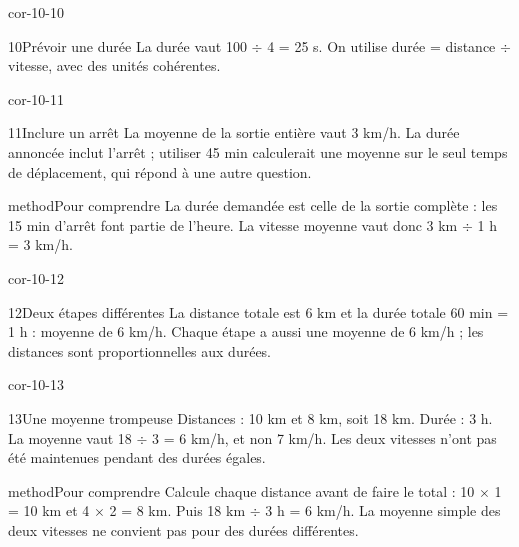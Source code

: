 \documentclass[12pt,twoside,openany]{book}
\begin{document}
\begin{blocLivre}{cor-10-10}
\begin{corrige}{10}{Prévoir une durée}
La durée vaut 100 \(\div\) 4 = 25 s. On utilise durée = distance \(\div\) vitesse, avec des unités cohérentes.\par
\end{corrige}\end{blocLivre}
\begin{blocLivre}{cor-10-11}
\begin{corrige}{11}{Inclure un arrêt}
La moyenne de la sortie entière vaut 3 km/h. La durée annoncée inclut l’arrêt ; utiliser 45 min calculerait une moyenne sur le seul temps de déplacement, qui répond à une autre question.\par
\begin{pcEncadre}{method}{Pour comprendre}
La durée demandée est celle de la sortie complète : les 15 min d’arrêt font partie de l’heure. La vitesse moyenne vaut donc 3 km \(\div\) 1 h = 3 km/h.\par
\end{pcEncadre}
\end{corrige}\end{blocLivre}
\begin{blocLivre}{cor-10-12}
\begin{corrige}{12}{Deux étapes différentes}
La distance totale est 6 km et la durée totale 60 min = 1 h : moyenne de 6 km/h. Chaque étape a aussi une moyenne de 6 km/h ; les distances sont proportionnelles aux durées.\par
\end{corrige}\end{blocLivre}
\begin{blocLivre}{cor-10-13}
\begin{corrige}{13}{Une moyenne trompeuse}
Distances : 10 km et 8 km, soit 18 km. Durée : 3 h. La moyenne vaut 18 \(\div\) 3 = 6 km/h, et non 7 km/h. Les deux vitesses n’ont pas été maintenues pendant des durées égales.\par
\begin{pcEncadre}{method}{Pour comprendre}
Calcule chaque distance avant de faire le total : 10 \(\times\) 1 = 10 km et 4 \(\times\) 2 = 8 km. Puis 18 km \(\div\) 3 h = 6 km/h. La moyenne simple des deux vitesses ne convient pas pour des durées différentes.\par
\end{pcEncadre}
\end{corrige}\end{blocLivre}
\end{document}
